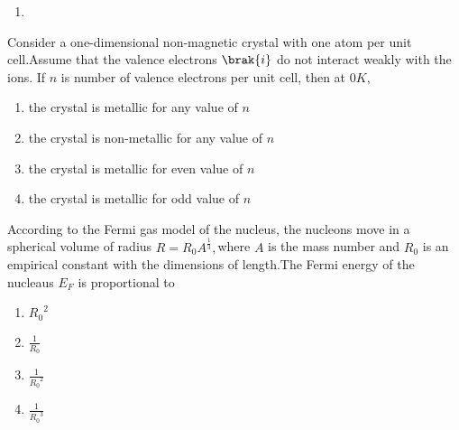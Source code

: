 \begin{enumerate}
\item 
{}

\end{enumerate}
    \item Consider a one-dimensional non-magnetic crystal with one atom per unit cell.Assume that the valence electrons $\brak{i}$ do not interact weakly with the ions. If $n$ is number of valence electrons per unit cell, then at $0K,$
    \begin{enumerate}
        \item the crystal is metallic for any value of $n$
        \item the crystal is non-metallic for any value of $n$
        \item the crystal is metallic for even value of $n$
        \item the crystal is metallic for odd value of $n$
    \end{enumerate}
    \item According to the Fermi gas model of the nucleus, the nucleons move in a spherical volume of radius $R=R_0A^{\frac{1}{3}},$where $A$ is the mass number and $R_0$ is an empirical constant with the dimensions of length.The Fermi energy of the nucleaus $E_F$ is proportional to
    \begin{enumerate}
        \item ${R_0}^2$
        \item $\frac{1}{R_0}$
        \item $\frac{1}{{R_0}^2}$
        \item $\frac{1}{{R_0}^3}$
    \end{enumerate}
